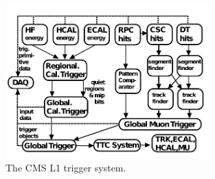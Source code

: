 \begin{figure}[hbp!]
\centering
\includegraphics[width=0.7\textwidth]{figs/CMS-TRG-12-001_Figure_002.pdf}
\caption{The CMS L1 trigger system.}
\label{fig:trigger}
\end{figure}
